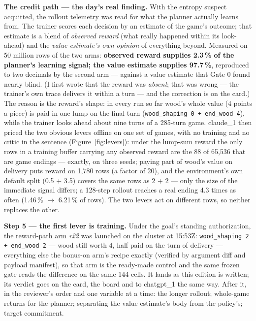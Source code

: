 \documentclass[11pt,a4paper]{article}
\begin{document}
\textbf{The credit path --- the day's real finding.} With the entropy suspect acquitted, the rollout telemetry was read for what the planner actually learns from. The trainer scores each decision by an estimate of the game's outcome; that estimate is a blend of \emph{observed reward} (what really happened within its look-ahead) and the \emph{value estimate's own opinion} of everything beyond. Measured on 50 million rows of the two arms: \textbf{observed reward supplies 2.3\,\% of the planner's learning signal; the value estimate supplies 97.7\,\%}, reproduced to two decimals by the second arm --- against a value estimate that Gate 0 found nearly blind. (I first wrote that the reward was \emph{absent}; that was wrong --- the trainer's own trace delivers it within a turn --- and the correction is on the card.) The reason is the reward's shape: in every run so far wood's whole value (4 points a piece) is paid in one lump on the final turn (\texttt{wood\_shaping 0 + end\_wood 4}), while the trainer looks ahead about nine turns of a 285-turn game. claude\_1 then priced the two obvious levers offline on one set of games, with no training and no critic in the sentence (Figure~\ref{fig:levers}): under the lump-sum reward the only rows in a training buffer carrying any observed reward are the 88 of 65,536 that are game endings --- exactly, on three seeds; paying part of wood's value on delivery puts reward on 1,780 rows (a factor of 20), and the environment's own default split (0.5 + 3.5) covers the same rows as 2 + 2 --- only the size of the immediate signal differs; a 128-step rollout reaches a real ending 4.3 times as often (1.46\,\% $\to$ 6.21\,\% of rows). The two levers act on different rows, so neither replaces the other.

\textbf{Step 5 --- the first lever is training.} Under the goal's standing authorization, the reward-path arm \emph{r22} was launched on the cluster at 15:53Z: \texttt{wood\_shaping 2 + end\_wood 2} --- wood still worth 4, half paid on the turn of delivery --- everything else the bonus-on arm's recipe exactly (verified by argument diff and payload manifest), so that arm is the ready-made control and the same frozen gate reads the difference on the same 144 cells. It lands as this edition is written; its verdict goes on the card, the board and to chatgpt\_1 the same way. After it, in the reviewer's order and one variable at a time: the longer rollout; whole-game returns for the planner; separating the value estimate's body from the policy's; target commitment.
\end{document}
